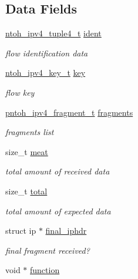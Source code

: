 \subsection*{Data Fields}
\begin{DoxyCompactItemize}
\item 
\hyperlink{structntoh__ipv4__tuple4__t}{ntoh\-\_\-ipv4\-\_\-tuple4\-\_\-t} \hyperlink{structntoh__ipv4__flow__t_a3d4334cd1cad89d0b3401c65411a9cad}{ident}
\begin{DoxyCompactList}\small\item\em flow identification data \end{DoxyCompactList}\item 
\hyperlink{ipv4defrag_8h_ab2ae468c8e84e7b93531ad554b039ca4}{ntoh\-\_\-ipv4\-\_\-key\-\_\-t} \hyperlink{structntoh__ipv4__flow__t_a93bab182dfe815bbd3f8bd00a6a4d4f7}{key}
\begin{DoxyCompactList}\small\item\em flow key \end{DoxyCompactList}\item 
\hyperlink{ipv4defrag_8h_a9b62b0538aa0f37ab5ed16c1d5f24256}{pntoh\-\_\-ipv4\-\_\-fragment\-\_\-t} \hyperlink{structntoh__ipv4__flow__t_a54c94fcc5ec977612392fc7e3bec767f}{fragments}
\begin{DoxyCompactList}\small\item\em fragments list \end{DoxyCompactList}\item 
size\-\_\-t \hyperlink{structntoh__ipv4__flow__t_a25cdc91a1ce3b46649beaacf6315dee7}{meat}
\begin{DoxyCompactList}\small\item\em total amount of received data \end{DoxyCompactList}\item 
size\-\_\-t \hyperlink{structntoh__ipv4__flow__t_a3fab45bb4d7cd7e889bdf00080096e8e}{total}
\begin{DoxyCompactList}\small\item\em total amount of expected data \end{DoxyCompactList}\item 
struct ip $\ast$ \hyperlink{structntoh__ipv4__flow__t_ac53ff70a1958fe8aea9dd55acb1792dd}{final\-\_\-iphdr}
\begin{DoxyCompactList}\small\item\em final fragment received? \end{DoxyCompactList}\item 
void $\ast$ \hyperlink{structntoh__ipv4__flow__t_aea3dcf0c8de30d192ee92494131c4996}{function}

\end{DoxyCompactItemize}
